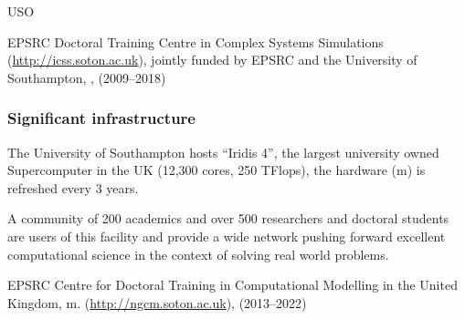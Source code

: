 \begin{sitedescription}{USO}
\begin{compactenum}
\item EPSRC Doctoral Training Centre in Complex Systems Simulations
  (\href{http://icss.soton.ac.uk}{http://icss.soton.ac.uk}), jointly
funded by EPSRC and the University of Southampton, , (2009--2018)
\end{compactenum}

\subsubsection*{Significant infrastructure}
\begin{compactenum}
\item The University of Southampton hosts ``Iridis 4'', the largest university owned
  Supercomputer in the UK (12,300 cores, 250 TFlops),
  the hardware (m) is refreshed every 3 years.
\item A community of 200 academics and over 500 researchers and
  doctoral students are users of this facility and provide a wide
  network pushing forward excellent computational science in the
  context of solving real world problems.
\item EPSRC Centre for Doctoral Training in Computational Modelling in
  the United Kingdom,
  m. (\href{http://ngcm.soton.ac.uk}{http://ngcm.soton.ac.uk}),
  (2013--2022)
\end{compactenum}
\end{sitedescription}







